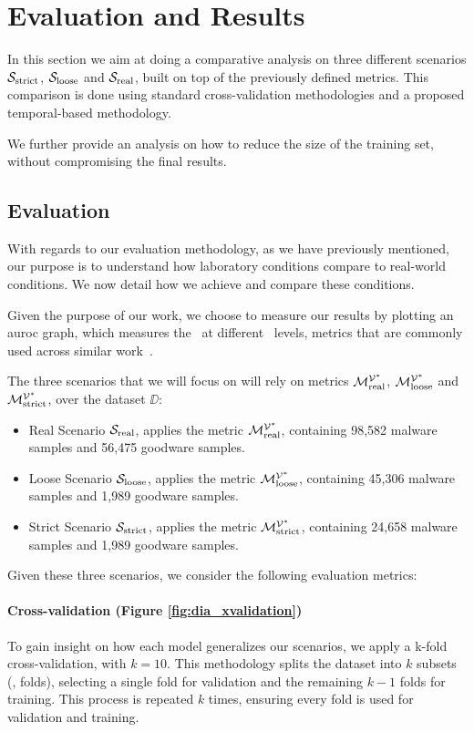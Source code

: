 \color{black}
\section{Evaluation and Results}\label{sec:eval_results}

In this section we aim at doing a comparative analysis on three different scenarios $\mathcal{S}_{\mathrm{strict}}$, $\mathcal{S}_{\mathrm{loose}}$ and $\mathcal{S}_{\mathrm{real}}$, built on top of the previously defined metrics. This comparison is done using standard cross-validation methodologies and a proposed temporal-based methodology.

We further provide an analysis on how to reduce the size of the training set, without compromising the final results.

\subsection{Evaluation}

With regards to our evaluation methodology, as we have previously mentioned, our purpose is to understand how laboratory conditions compare to real-world conditions.
We now detail how we achieve and compare these conditions.

Given the purpose of our work, we choose to measure our results by plotting an \gls{auroc} graph, which measures the \tpr~at different \fpr~levels, metrics that are commonly used across similar work~\cite{miller:rev_int,nissim:al_pdf,schultz:data_mining}.

The three scenarios that we will focus on will rely on metrics $\mathcal{M}_{\mathrm{real}}^{\mathcal{V}^*}$, $\mathcal{M}_{\mathrm{loose}}^{\mathcal{V}^*}$ and $\mathcal{M}_{\mathrm{strict}}^{\mathcal{V}^*}$, over the dataset $\DD$:

\begin{itemize}
	\item Real Scenario $\mathcal{S}_{\mathrm{real}}$, applies the metric $\mathcal{M}_{\mathrm{real}}^{\mathcal{V}^*}$, containing 98,582 malware samples and 56,475 goodware samples.
	\item Loose Scenario $\mathcal{S}_{\mathrm{loose}}$, applies the metric $\mathcal{M}_{\mathrm{loose}}^{\mathcal{V}^*}$, containing 45,306 malware samples and 1,989 goodware samples.
	\item Strict Scenario $\mathcal{S}_{\mathrm{strict}}$, applies the metric $\mathcal{M}_{\mathrm{strict}}^{\mathcal{V}^*}$, containing 24,658 malware samples and 1,989 goodware samples.
\end{itemize}

Given these three scenarios, we consider the following evaluation metrics:

\paragraph{Cross-validation (Figure \ref{fig:dia_xvalidation})}
To gain insight on how each model generalizes our scenarios, we apply a k-fold cross-validation, with $k=10$. This methodology splits the dataset into $k$ subsets (\ie, folds), selecting a single fold for validation and the remaining $k-1$ folds for training. This process is repeated $k$ times, ensuring every fold is used for validation and training.

